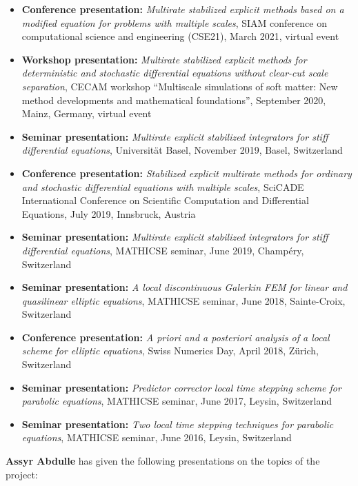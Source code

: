 \documentclass[10pt]{article}
\begin{document}
\begin{itemize}
	\item \textbf{Conference presentation:} \textit{Multirate stabilized explicit methods based on a modified equation for problems with multiple scales}, SIAM conference on computational science and engineering (CSE21), March 2021, virtual event
	\item \textbf{Workshop presentation:} \textit{Multirate stabilized explicit methods for deterministic and stochastic differential equations without clear-cut scale separation}, CECAM workshop ``Multiscale simulations of soft matter: New method developments and mathematical foundations'', September 2020, Mainz, Germany, virtual event 
	\item \textbf{Seminar presentation:} \textit{Multirate explicit stabilized integrators for stiff differential equations}, Universität Basel, November 2019, Basel, Switzerland
	\item \textbf{Conference presentation:} \textit{Stabilized explicit multirate methods for ordinary and stochastic differential equations with multiple scales}, SciCADE International Conference on Scientific Computation and Differential Equations, July 2019, Innsbruck, Austria
	\item \textbf{Seminar presentation:} \textit{Multirate explicit stabilized integrators for stiff differential equations}, MATHICSE seminar, June 2019, Champéry, Switzerland
	\item \textbf{Seminar presentation:} \textit{A local discontinuous Galerkin FEM for linear and quasilinear elliptic equations}, MATHICSE seminar, June 2018, Sainte-Croix, Switzerland
	\item \textbf{Conference presentation:} \textit{A priori and a posteriori analysis of a local scheme for elliptic equations}, Swiss Numerics Day, April 2018, Zürich, Switzerland
	\item \textbf{Seminar presentation:} \textit{Predictor corrector local time stepping scheme for parabolic equations}, MATHICSE seminar, June 2017, Leysin, Switzerland
	\item \textbf{Seminar presentation:} \textit{Two local time stepping techniques for parabolic equations}, MATHICSE seminar, June 2016, Leysin, Switzerland
\end{itemize}
%
\textbf{Assyr Abdulle} has given the following presentations on the topics of the project:
\end{document}
